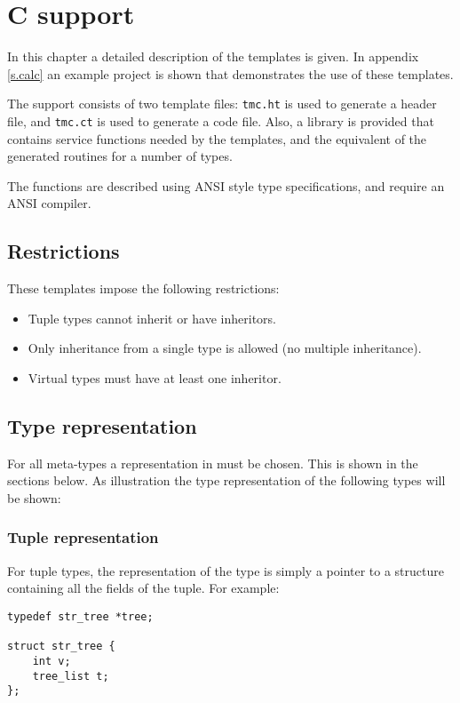\chapter{C support}
\label{s.tmc}
In this chapter a detailed description of the {\C} templates is given.
In appendix \ref{s.calc} an example project is shown that demonstrates
the use of these templates.
\par
The {\C} support consists of two template files: {\tt tmc.ht} is used
to generate a header file, and {\tt tmc.ct} is used to generate a code
file. Also, a library is provided that contains service functions
needed by the templates, and the equivalent of the generated routines
for a number of {\C} types.
\par
{}
The functions are described using ANSI {\C} style type specifications,
and require an ANSI {\C} compiler.
\section{Restrictions}
These templates impose the following restrictions:
\begin{itemize}
\item Tuple types cannot inherit or have inheritors.
\item Only inheritance from a single type is allowed (no multiple inheritance).
\item Virtual types must have at least one inheritor.
\end{itemize}
\section{Type representation}
For all {\Tm} meta-types a representation in {\C} must be chosen.
This is shown in the sections below.
As illustration the type representation of the following types
will be shown:

\subsection{Tuple representation}
For tuple types, the representation of the type is simply a pointer to
a structure containing all the fields of the tuple.
For example:
\begin{showfile}
\begin{verbatim}
typedef str_tree *tree;

struct str_tree {
    int v;
    tree_list t;
};
\end{verbatim}
\end{showfile}
